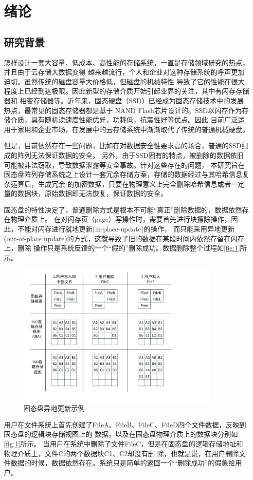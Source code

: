 
\chapter{绪论}

\section{研究背景}
怎样设计一套大容量、低成本、高性能的存储系统，一直是存储领域研究的热点，并且由于云存储大数据变得
越来越流行，个人和企业对这种存储系统的呼声更加迫切。虽然传统的磁盘容量大价格低，但磁盘的机械特性
导致了它的性能在很大程度上已经到达极限。因此新型的存储介质开始引起业界的关注，其中有闪存存储器和
相变存储器等。近年来，固态硬盘（SSD）已经成为固态存储技术中的发展热点，最常见的固态存储器都是基于
NAND Flash芯片设计的。SSD以闪存作为存储介质，具有随机读速度性能优异，功耗低，抗震性好等优点。因此
目前广泛运用于家用和企业市场，在发展中的云存储系统中渐渐取代了传统的普通机械硬盘。


但是，目前依然存在一些问题，比如在对数据安全性要求高的场合，普通的SSD组成的阵列无法保证数据的安全。
另外，由于SSD固有的特点，被删除的数据依旧可能被非法窃取，导致数据泄露等安全事故。针对这些存在的问题，
本研究旨在固态盘阵列存储系统之上设计一套冗余存储方案，存储的数据经过与其哈希信息复杂运算后，生成冗余
的加密数据，只要在物理意义上完全删除哈希信息或者一定量的数据块，原始数据即无法恢复，保证数据的安全。


固态盘的特性决定了，普通删除方式是根本不可能“真正”删除数据的，数据依然存在物理介质上\cite{秦亦2014固态盘可用性增强算法研究}。
在对闪存页（page）写操作时，需要首先进行块擦除操作，因此，不能对闪存进行就地更新(in-place-update)的操作，
而只能采用异地更新(out-of-place update)的方式，这就导致了旧的数据在某段时间内依然存留在闪存上，删除
操作只是系统反馈的一个“假的”删除成功。数据删除整个过程如\autoref{fig:1}所示。
\begin{figure}
\centering
\includegraphics[width=4in]{Pics/fig-out-of-place.pdf}
\caption{固态盘异地更新示例}\label{fig:1}
\end{figure}
用户在文件系统上首先创建了FileA、FileB、FileC、FileD四个文件数据，反映到固态盘的逻辑块存储视图上的
数据，以及在固态盘物理介质上的数据块分别如\autoref{fig:1}所示。
当用户在系统中删除了文件FileC，但是在固态盘的逻辑存储地址和物理介质上，文件C的两个数据块C1、C2却没有删
除，也就是说，在用户删除文件数据的时候，数据依然存在。系统只是简单的返回一个“删除成功”的假象给用户。


